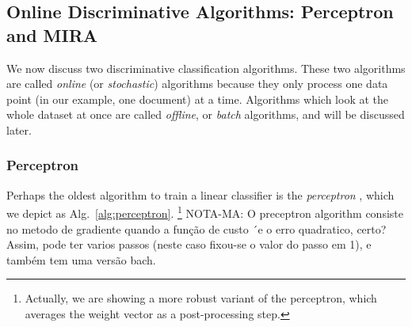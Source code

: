 \subsection{Online Discriminative Algorithms: Perceptron and MIRA}

We now discuss two discriminative classification algorithms. These two algorithms are called \emph{online} (or \emph{stochastic}) algorithms because they only process one data point (in our example, one document) at a time. Algorithms which look at the whole dataset at once are called \emph{offline}, or \emph{batch} algorithms, and will be discussed later.

\subsubsection{\label{s:perceptron} Perceptron}

Perhaps the oldest algorithm to train a linear classifier is the \emph{perceptron} \citep{Rosenblatt1958}, 
which we depict as Alg.~\ref{alg:perceptron}.%
\footnote{Actually, we are showing a more robust variant of the perceptron, 
which averages the weight vector as a post-processing step.} 
NOTA-MA: O preceptron algorithm consiste no metodo de gradiente quando a função de custo ´e o erro quadratico, certo? Assim, pode ter varios passos (neste caso fixou-se o valor do passo em 1), e também tem uma versão bach. 


